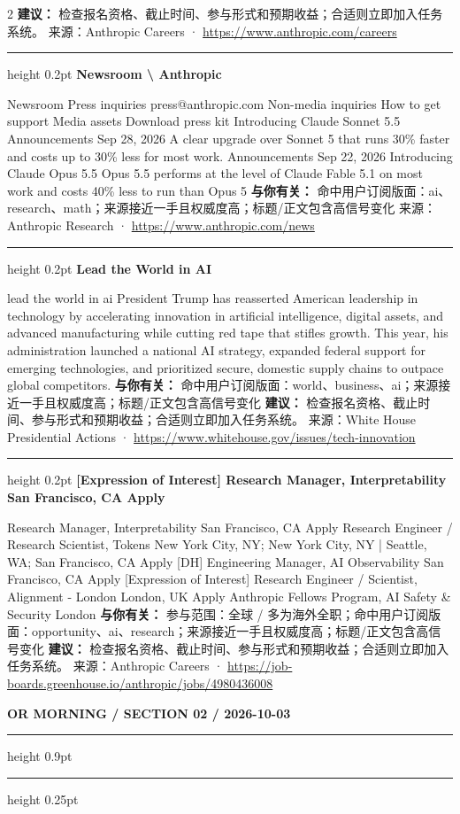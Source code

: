 \documentclass[10.5pt]{ctexart}
\begin{document}
\begin{multicols}{2}
\textbf{建议：} 检查报名资格、截止时间、参与形式和预期收益；合适则立即加入任务系统。
{\footnotesize\color{ormuted} 来源：Anthropic Careers · \url{https://www.anthropic.com/careers}}
\vspace{2mm}
\hrule height 0.2pt
\vspace{2mm}
{\large\bfseries Newsroom \textbackslash{} Anthropic}\par
Newsroom Press inquiries press@anthropic.com Non-media inquiries How to get support Media assets Download press kit Introducing Claude Sonnet 5.5 Announcements Sep 28, 2026 A clear upgrade over Sonnet 5 that runs 30\% faster and costs up to 30\% less for most work. Announcements Sep 22, 2026 Introducing Claude Opus 5.5 Opus 5.5 performs at the level of Claude Fable 5.1 on most work and costs 40\% less to run than Opus 5
\textbf{与你有关：} 命中用户订阅版面：ai、research、math；来源接近一手且权威度高；标题/正文包含高信号变化
{\footnotesize\color{ormuted} 来源：Anthropic Research · \url{https://www.anthropic.com/news}}
\vspace{2mm}
\hrule height 0.2pt
\vspace{2mm}
{\large\bfseries Lead the World in AI}\par
lead the world in ai President Trump has reasserted American leadership in technology by accelerating innovation in artificial intelligence, digital assets, and advanced manufacturing while cutting red tape that stifles growth. This year, his administration launched a national AI strategy, expanded federal support for emerging technologies, and prioritized secure, domestic supply chains to outpace global competitors.
\textbf{与你有关：} 命中用户订阅版面：world、business、ai；来源接近一手且权威度高；标题/正文包含高信号变化
\textbf{建议：} 检查报名资格、截止时间、参与形式和预期收益；合适则立即加入任务系统。
{\footnotesize\color{ormuted} 来源：White House Presidential Actions · \url{https://www.whitehouse.gov/issues/tech-innovation}}
\vspace{2mm}
\hrule height 0.2pt
\vspace{2mm}
{\large\bfseries [Expression of Interest] Research Manager, Interpretability San Francisco, CA Apply}\par
[Expression of Interest] Research Manager, Interpretability San Francisco, CA Apply Research Engineer / Research Scientist, Tokens New York City, NY; New York City, NY | Seattle, WA; San Francisco, CA Apply [DH] Engineering Manager, AI Observability San Francisco, CA Apply [Expression of Interest] Research Engineer / Scientist, Alignment - London London, UK Apply Anthropic Fellows Program, AI Safety \& Security London
\textbf{与你有关：} 参与范围：全球 / 多为海外全职；命中用户订阅版面：opportunity、ai、research；来源接近一手且权威度高；标题/正文包含高信号变化
\textbf{建议：} 检查报名资格、截止时间、参与形式和预期收益；合适则立即加入任务系统。
{\footnotesize\color{ormuted} 来源：Anthropic Careers · \url{https://job-boards.greenhouse.io/anthropic/jobs/4980436008}}
\end{multicols}
\newpage
{\small\bfseries OR MORNING / SECTION 02 / 2026-10-03}
\vspace{2mm}
\hrule height 0.9pt
\vspace{1.5mm}
\hrule height 0.25pt
\vspace{4mm}
\end{document}

